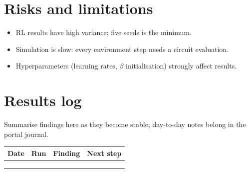 \documentclass[11pt,a4paper]{article}
\begin{document}
\section{Risks and limitations}
\begin{itemize}
  \item RL results have high variance; five seeds is the minimum.
  \item Simulation is slow: every environment step needs a circuit evaluation.
  \item Hyperparameters (learning rates, $\beta$ initialisation) strongly affect results.
\end{itemize}

\section{Results log}
\label{sec:log}
Summarise findings here as they become stable; day-to-day notes belong in the portal journal.

\begin{table}[h]
\centering\small
\begin{tabularx}{\linewidth}{@{}l l >{\raggedright}X >{\raggedright\arraybackslash}X@{}}
\toprule
Date & Run & Finding & Next step \\
\midrule
 & & & \\
 & & & \\
 & & & \\
\bottomrule
\end{tabularx}
\end{table}



\end{document}
